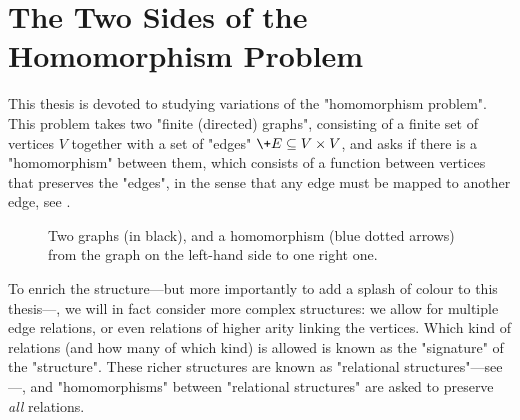 \section{The Two Sides of the Homomorphism Problem}

This thesis is devoted to studying variations of the "homomorphism problem".
This problem takes two "finite (directed) graphs", consisting of a finite set of vertices $V$
together with a set of "edges" $\+E \subseteq V \times V$, and asks if there is a "homomorphism" 
between them, which consists of a function between vertices that preserves
the "edges", in the sense that any edge must be mapped to another edge,
see .

\begin{figure}
	\centering
	\caption{
		\AP\label{fig:example-graph-homomorphism}
		Two graphs (in black), and a homomorphism (blue dotted arrows) from the
		graph on the left-hand side to one right one.
	}
\end{figure}

To enrich the structure---but more importantly to add a splash of colour to this thesis---,
we will in fact consider more complex structures: 
we allow for multiple edge relations, or even relations of higher arity linking the vertices.
Which kind of relations (and how many of which kind) is allowed is known as the "signature" of
the "structure". 
These richer structures are known as "relational structures"---see
---, and
"homomorphisms" between "relational structures" are asked to preserve \emph{all} relations.

